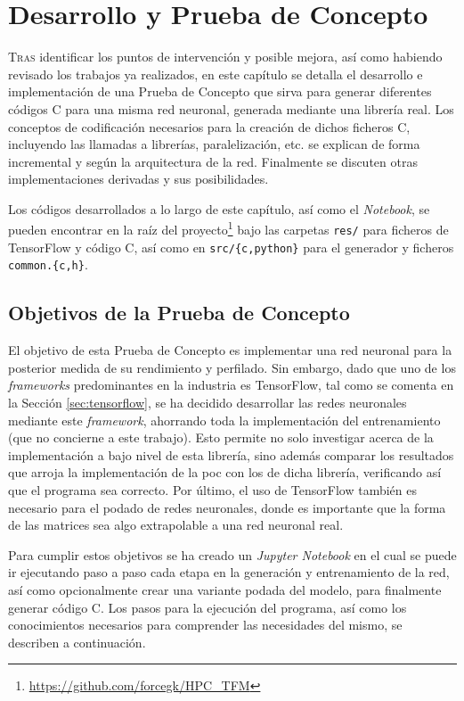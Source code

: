 \chapter{Desarrollo y Prueba de Concepto}
\label{chap:desarrollo_poc}

\lettrine{T}{ras} identificar los puntos de intervención y posible mejora, así como habiendo revisado los trabajos ya realizados, en este capítulo se detalla el desarrollo e implementación de una Prueba de Concepto que sirva para generar diferentes códigos C para una misma red neuronal, generada mediante una librería real. Los conceptos de codificación necesarios para la creación de dichos ficheros C, incluyendo las llamadas a librerías, paralelización, etc. se explican de forma incremental y según la arquitectura de la red. Finalmente se discuten otras implementaciones derivadas y sus posibilidades.

Los códigos desarrollados a lo largo de este capítulo, así como el \textit{Notebook}, se pueden encontrar en la raíz del proyecto\footnote{\url{https://github.com/forcegk/HPC_TFM}} bajo las carpetas \texttt{res/} para ficheros de TensorFlow y código C, así como en \texttt{src/\{c,python\}} para el generador y ficheros \texttt{common.\{c,h\}}.

\section{Objetivos de la Prueba de Concepto}
\label{sec:objetivos_poc}
El objetivo de esta Prueba de Concepto es implementar una red neuronal para la posterior medida de su rendimiento y perfilado. Sin embargo, dado que uno de los \textit{frameworks} predominantes en la industria es TensorFlow, tal como se comenta en la Sección \ref{sec:tensorflow}, se ha decidido desarrollar las redes neuronales mediante este \textit{framework}, ahorrando toda la implementación del entrenamiento (que no concierne a este trabajo). Esto permite no solo investigar acerca de la implementación a bajo nivel de esta librería, sino además comparar los resultados que arroja la implementación de la \acrshort{poc} con los de dicha librería, verificando así que el programa sea correcto. Por último, el uso de TensorFlow también es necesario para el podado de redes neuronales, donde es importante que la forma de las matrices sea algo extrapolable a una red neuronal real.

Para cumplir estos objetivos se ha creado un \textit{Jupyter Notebook} en el cual se puede ir ejecutando paso a paso cada etapa en la generación y entrenamiento de la red, así como opcionalmente crear una variante podada del modelo, para finalmente generar código C. Los pasos para la ejecución del programa, así como los conocimientos necesarios para comprender las necesidades del mismo, se describen a continuación.

